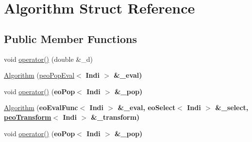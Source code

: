 \hypertarget{structAlgorithm}{
\section{Algorithm Struct Reference}
\label{structAlgorithm}
}
\subsection*{Public Member Functions}
\begin{CompactItemize}
\item 
\hypertarget{structAlgorithm_230861c20d5c8e873791fe55c45c4e95}{
void \hyperlink{structAlgorithm_230861c20d5c8e873791fe55c45c4e95}{operator()} (double \&\_\-d)}
\label{structAlgorithm_230861c20d5c8e873791fe55c45c4e95}

\item 
\hypertarget{structAlgorithm_e8ee2126f824504db5dde5dbd22fe2b9}{
\hyperlink{structAlgorithm_e8ee2126f824504db5dde5dbd22fe2b9}{Algorithm} (\hyperlink{classpeoPopEval}{peo\-Pop\-Eval}$<$ \bf{Indi} $>$ \&\_\-eval)}
\label{structAlgorithm_e8ee2126f824504db5dde5dbd22fe2b9}

\item 
\hypertarget{structAlgorithm_5b7cae07912e409b213ed46fc08cbf0f}{
void \hyperlink{structAlgorithm_5b7cae07912e409b213ed46fc08cbf0f}{operator()} (\bf{eo\-Pop}$<$ \bf{Indi} $>$ \&\_\-pop)}
\label{structAlgorithm_5b7cae07912e409b213ed46fc08cbf0f}

\item 
\hypertarget{structAlgorithm_1df7f2cdc9cbe367f07741382c66eef6}{
\hyperlink{structAlgorithm_1df7f2cdc9cbe367f07741382c66eef6}{Algorithm} (\bf{eo\-Eval\-Func}$<$ \bf{Indi} $>$ \&\_\-eval, \bf{eo\-Select}$<$ \bf{Indi} $>$ \&\_\-select, \hyperlink{classpeoTransform}{peo\-Transform}$<$ \bf{Indi} $>$ \&\_\-transform)}
\label{structAlgorithm_1df7f2cdc9cbe367f07741382c66eef6}

\item 
\hypertarget{structAlgorithm_5b7cae07912e409b213ed46fc08cbf0f}{
void \hyperlink{structAlgorithm_5b7cae07912e409b213ed46fc08cbf0f}{operator()} (\bf{eo\-Pop}$<$ \bf{Indi} $>$ \&\_\-pop)}
\label{structAlgorithm_5b7cae07912e409b213ed46fc08cbf0f}

\end{CompactItemize}
